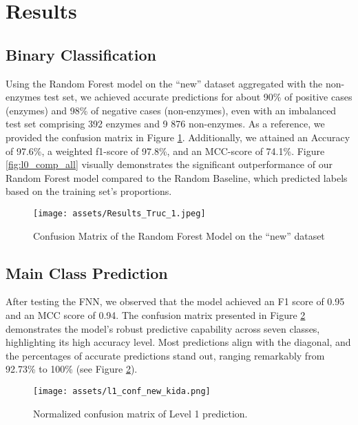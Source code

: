 \documentclass{bioinfo}
\begin{document}
\section{Results}	

\subsection{Binary Classification}\label{sec:RF_level0}
Using the Random Forest model on the ``new'' dataset aggregated with the non-enzymes test set, we achieved accurate
predictions for about 90\% of positive cases (enzymes) and 98\% of negative
cases (non-enzymes), even with an imbalanced test set comprising 392
enzymes and 9 876 non-enzymes. As a reference, we provided the confusion
matrix in Figure \ref{fig:RF_conf_l0}.
Additionally, we attained an Accuracy of 97.6\%, a weighted f1-score of
97.8\%, and an MCC-score of 74.1\%. Figure \ref{fig:l0_comp_all} visually demonstrates the significant outperformance of our Random Forest model 
compared to the Random Baseline, which predicted labels based on the training set's proportions.

\begin{figure}[!hb]
\texttt{[image: assets/Results\_Truc\_1.jpeg]}
\caption{Confusion Matrix of the Random Forest Model on the “new” dataset}\label{fig:RF_conf_l0}
\end{figure}


\subsection{Main Class Prediction}
After testing the FNN, we observed that the model achieved an F1 score of 0.95 and an MCC score of 0.94. 
The confusion matrix presented in Figure \ref{fig:FNN_conf_l1} demonstrates the model's robust predictive capability across seven classes, 
highlighting its high accuracy level. Most predictions align with the diagonal, and the percentages of accurate predictions stand out, 
ranging remarkably from 92.73\% to 100\% (see Figure \ref{fig:FNN_conf_l1}).

\begin{figure}[!t]
\texttt{[image: assets/l1\_conf\_new\_kida.png]}
\caption{Normalized confusion matrix of Level 1 prediction.}\label{fig:FNN_conf_l1}
\end{figure}
\end{document}
